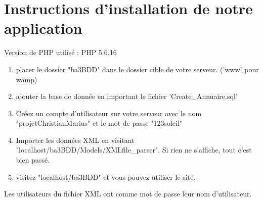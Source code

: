 \documentclass[11pt,a4paper]{report}
\begin{document}
\section*{Instructions d'installation de notre application}
Version de PHP utilisé : PHP 5.6.16
\begin{enumerate}
\item placer le dossier "ba3BDD" dans le dossier cible de votre serveur. ('www' pour wamp) 
\item ajouter la base de donnée en important le fichier 'Create\_Annuaire.sql' 
\item Créez un compte d'utilisateur sur votre serveur avec le nom "projetChristianMarius" et le mot de passe "123soleil"
\item Importer les données XML en visitant "localhost/ba3BDD/Models/XMLfile\_parser". Si rien ne s'affiche, tout c'est bien passé.
\item visitez "localhost/ba3BDD" et vous pouvez utiliser le site.
\end{enumerate} 
Les utilisateurs du fichier XML ont comme mot de passe leur nom d'utilisateur.
\end{document}
